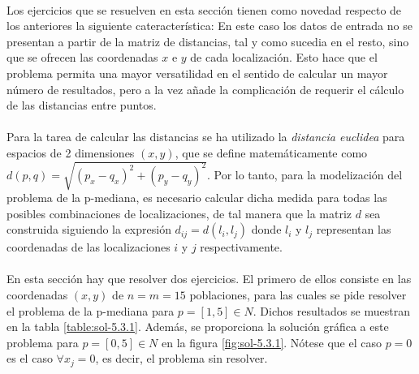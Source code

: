 \documentclass[spanish]{article}
\begin{document}
			\paragraph{}
			Los ejercicios que se resuelven en esta sección tienen como novedad respecto de los anteriores la siguiente cateracterística: En este caso los datos de entrada no se presentan a partir de la matriz de distancias, tal y como sucedia en el resto, sino que se ofrecen las coordenadas $x$ e $y$ de cada localización. Esto hace que el problema permita una mayor versatilidad en el sentido de calcular un mayor número de resultados, pero a la vez añade la complicación de requerir el cálculo de las distancias entre puntos.

			\paragraph{}
			Para la tarea de calcular las distancias se ha utilizado la \emph{distancia euclidea} para espacios de 2 dimensiones $(x,y)$, que se define matemáticamente como $d(p, q) = \sqrt{(p_x - q_x)^2 + (p_y - q_y)^2}$. Por lo tanto, para la modelización del problema de la p-mediana, es necesario calcular dicha medida para todas las posibles combinaciones de localizaciones, de tal manera que la matriz $d$ sea construida siguiendo la expresión $d_{ij} = d(l_i, l_j)$ donde $l_i$ y $l_j$ representan las coordenadas de las localizaciones $i$ y $j$ respectivamente.


			\paragraph{}
			En esta sección hay que resolver dos ejercicios. El primero de ellos consiste en las coordenadas $(x,y)$ de $n = m = 15$ poblaciones, para las cuales se pide resolver el problema de la p-mediana para $p = [1,5] \in N$. Dichos resultados se muestran en la tabla \ref{table:sol-5.3.1}. Además, se proporciona la solución gráfica a este problema para $p = [0,5] \in N$ en la figura \ref{fig:sol-5.3.1}. Nótese que el caso $p = 0$ es el caso $\forall x_j = 0$, es decir, el problema sin resolver.
\end{document}
